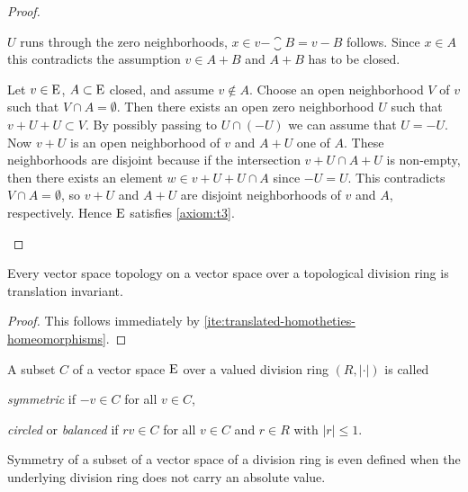 \begin{proof}
\begin{adromanlist}
    $U$ runs through the zero neighborhoods,
    $x \in v - \closure{B} = v -B$ follows. Since $x \in A$ this contradicts the assumption
    $v \in A+B$ and $A+B$ has to be closed.
  \item
    Let $v \in \mathrm{E}$, $A\subset \mathrm{E}$ closed, and assume $v \notin A$.
    Choose an open neighborhood $V$ of $v$ such that $V \cap A = \emptyset$. Then there
    exists an open zero neighborhood $U$ such that $v + U + U \subset V$. By possibly passing to
    $U \cap (-U)$ we can assume that $U = -U$. Now $v+U$ is an open neighborhood of $v$
    and $A+U$ one of $A$. These neighborhoods are disjoint because if the intersection
    $v+U \cap A+U$ is non-empty, then there exists an element $w \in v+U + U\cap A$ since
    $-U =U$. This contradicts  $V \cap A = \emptyset$, so   $v+U$ and $A+U$ are disjoint neighborhoods
    of $v$ and $A$, respectively. Hence $\mathrm{E}$ satisfies \ref{axiom:t3}.
  \end{adromanlist}
\end{proof}

\begin{corollary}
  Every vector space topology on a vector space over a topological division ring
  is translation invariant.
\end{corollary}

\begin{proof}
  This follows immediately by
  \ref{ite:translated-homotheties-homeomorphisms}.
\end{proof}

\begin{definition}
  A subset $C$ of a  vector space  $\mathrm{E}$  over a valued division ring $(R,|\cdot|)$ is called
  \begin{romanlist}
  \item
    \emph{symmetric} if $-v \in C$ for all $v\in C$,
  \item
    \emph{circled} or \emph{balanced} if $rv \in C$ for all $v\in C$ and $r\in R$ with $|r| \leq 1$.
  \end{romanlist}
\end{definition}

\begin{remark}
  Symmetry of a subset of a vector space of a division ring is even defined when the underlying division
  ring does not carry an absolute value. 
\end{remark}

